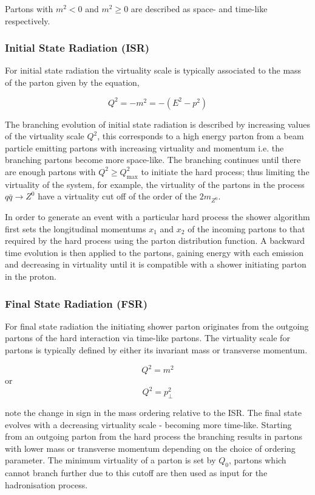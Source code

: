 Partons with $m^2 < 0$  and $m^2 \ge 0$ are described as space- and time-like respectively. 

\subsubsection*{Initial State Radiation (ISR)}
For initial state radiation the virtuality scale is typically associated to the mass of the parton given by the equation,

\begin{equation}
	Q^2 = -m^2 = -(E^2 - p^2)
\end{equation}

The branching evolution of initial state radiation is described by increasing values of the virtuality scale $Q^2$, this corresponds to a high energy parton from a beam particle emitting partons with increasing virtuality and momentum i.e. the branching partons become more space-like. The branching continues until there are enough partons with $Q^2 \ge Q^2_{\mathrm{max}}$ to initiate the hard process; thus limiting the virtuality of the system, for example, the virtuality of the partons in the process $q\bar{q} \rightarrow Z^0$ have a virtuality cut off of the order of the $2m_{Z^0}$.

In order to generate an event with a particular hard process the shower algorithm first sets the longitudinal momentums $x_1$ and $x_2$ of the incoming partons to that required by the hard process using the parton distribution function. A backward time evolution is then applied to the partons, gaining energy with each emission and decreasing in virtuality until it is compatible with a shower initiating parton in the proton.

\subsubsection*{Final State Radiation (FSR)}
For final state radiation the initiating shower parton originates from the outgoing partons of the hard interaction via time-like partons. The virtuality scale for partons is typically defined by either its invariant mass or transverse momentum.

\begin{equation}
	Q^2 = m^2
\end{equation}
or
\begin{equation}
	Q^2 = p_\perp^2
\end{equation}

note the change in sign in the mass ordering relative to the ISR. The final state evolves with a decreasing virtuality scale - becoming more time-like. Starting from an outgoing parton from the hard process the branching results in partons with lower mass or transverse momentum depending on the choice of ordering parameter. The minimum virtuality of a parton is set by $Q_0$, partons which cannot branch further due to this cutoff are then used as input for the hadronisation process.


